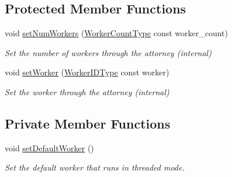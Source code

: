 \subsection*{Protected Member Functions}
\begin{DoxyCompactItemize}
\item 
void \hyperlink{structvt_1_1ctx_1_1_context_afc4549ac9cdae67301613613b9381d1c}{set\+Num\+Workers} (\hyperlink{namespacevt_aa93398ea48f2cb6c188512250f7cc248}{Worker\+Count\+Type} const worker\+\_\+count)
\begin{DoxyCompactList}\small\item\em Set the number of workers through the attorney (internal) \end{DoxyCompactList}\item 
void \hyperlink{structvt_1_1ctx_1_1_context_a32f62f26b7a6977c91186f8c2aa2b16a}{set\+Worker} (\hyperlink{namespacevt_a656e362091da17b9b93d0655b36e3392}{Worker\+I\+D\+Type} const worker)
\begin{DoxyCompactList}\small\item\em Set the worker through the attorney (internal) \end{DoxyCompactList}\end{DoxyCompactItemize}
\subsection*{Private Member Functions}
\begin{DoxyCompactItemize}
\item 
void \hyperlink{structvt_1_1ctx_1_1_context_ab61a961c47c8fc6393df8c121ade3aa2}{set\+Default\+Worker} ()
\begin{DoxyCompactList}\small\item\em Set the default worker that runs in threaded mode. \end{DoxyCompactList}\end{DoxyCompactItemize}

